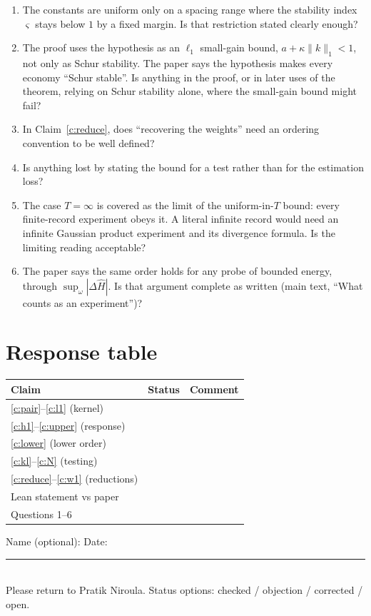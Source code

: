 \documentclass[11pt]{article}
\begin{document}
\begin{enumerate}[leftmargin=*]
\item The constants are uniform only on a spacing range where the stability index $\varsigma$ stays below $1$ by a fixed margin. Is that restriction stated clearly enough?
\item The proof uses the hypothesis as an $\ell_1$ small-gain bound, $a+\kappa\|k\|_1<1$, not only as Schur stability. The paper says the hypothesis makes every economy ``Schur stable''. Is anything in the proof, or in later uses of the theorem, relying on Schur stability alone, where the small-gain bound might fail?
\item In Claim~\ref{c:reduce}, does ``recovering the weights'' need an ordering convention to be well defined?
\item Is anything lost by stating the bound for a test rather than for the estimation loss?
\item The case $T=\infty$ is covered as the limit of the uniform-in-$T$ bound: every finite-record experiment obeys it. A literal infinite record would need an infinite Gaussian product experiment and its divergence formula. Is the limiting reading acceptable?
\item The paper says the same order holds for any probe of bounded energy, through $\sup_\omega|\Delta\hat H|$. Is that argument complete as written (main text, ``What counts as an experiment'')?
\end{enumerate}

\section*{Response table}
\renewcommand{\arraystretch}{1.25}
\begin{tabular}{@{}l>{\raggedright\arraybackslash}p{}>{\raggedright\arraybackslash}p{}@{}}
\toprule
Claim & Status & Comment\\
\midrule
\ref{c:pair}--\ref{c:l1} (kernel) & & \\
\ref{c:h1}--\ref{c:upper} (response) & & \\
\ref{c:lower} (lower order) & & \\
\ref{c:kl}--\ref{c:N} (testing) & & \\
\ref{c:reduce}--\ref{c:w1} (reductions) & & \\
Lean statement vs paper & & \\
Questions 1--6 & & \\
\bottomrule
\end{tabular}

\medskip
Name (optional): \hrulefill\quad Date: \rule{3cm}{0.4pt}\\[4pt]
Please return to Pratik Niroula. Status options: checked / objection / corrected / open.
\end{document}

